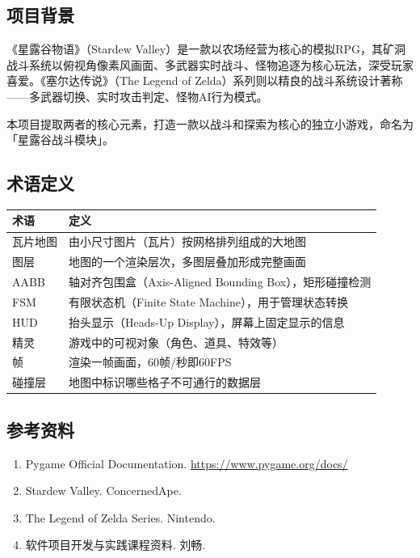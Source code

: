 \documentclass[12pt,a4paper]{article}
\begin{document}
\subsection{项目背景}

《星露谷物语》（Stardew Valley）是一款以农场经营为核心的模拟RPG，其矿洞战斗系统以俯视角像素风画面、多武器实时战斗、怪物追逐为核心玩法，深受玩家喜爱。《塞尔达传说》（The Legend of Zelda）系列则以精良的战斗系统设计著称——多武器切换、实时攻击判定、怪物AI行为模式。

本项目提取两者的核心元素，打造一款以战斗和探索为核心的独立小游戏，命名为「星露谷战斗模块」。

\subsection{术语定义}

\begin{table}[htbp]
\centering
\begin{tabularx}{\textwidth}{lX}
\toprule
\textbf{术语} & \textbf{定义} \\
\midrule
瓦片地图 & 由小尺寸图片（瓦片）按网格排列组成的大地图 \\
图层 & 地图的一个渲染层次，多图层叠加形成完整画面 \\
AABB & 轴对齐包围盒（Axis-Aligned Bounding Box），矩形碰撞检测 \\
FSM & 有限状态机（Finite State Machine），用于管理状态转换 \\
HUD & 抬头显示（Heads-Up Display），屏幕上固定显示的信息 \\
精灵 & 游戏中的可视对象（角色、道具、特效等） \\
帧 & 渲染一帧画面，60帧/秒即60FPS \\
碰撞层 & 地图中标识哪些格子不可通行的数据层 \\
\bottomrule
\end{tabularx}
\end{table}

\subsection{参考资料}

\begin{enumerate}[leftmargin=2em]
    \item Pygame Official Documentation. \url{https://www.pygame.org/docs/}
    \item Stardew Valley. ConcernedApe.
    \item The Legend of Zelda Series. Nintendo.
    \item 软件项目开发与实践课程资料. 刘畅.
\end{enumerate}
\end{document}
